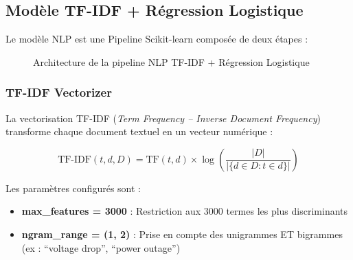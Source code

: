 \documentclass[12pt,a4paper]{report}
\begin{document}
\subsection{Mod\`{e}le TF-IDF + R\'{e}gression Logistique}

Le mod\`{e}le NLP est une Pipeline Scikit-learn compos\'{e}e de deux \'{e}tapes :

\begin{figure}[H]
\centering
{}
\caption{Architecture de la pipeline NLP TF-IDF + R\'{e}gression Logistique}
\label{fig:nlp_arch}
\end{figure}

\subsubsection{TF-IDF Vectorizer}

La vectorisation TF-IDF (\textit{Term Frequency -- Inverse Document Frequency}) transforme chaque document textuel en un vecteur num\'{e}rique :

\begin{equation}
  \text{TF-IDF}(t, d, D) = \text{TF}(t, d) \times \log\!\left(\frac{|D|}{|\{d \in D : t \in d\}|}\right)
  \label{eq:tfidf}
\end{equation}

Les param\`{e}tres configur\'{e}s sont :
\begin{itemize}
  \item \textbf{max\_features = 3000} : Restriction aux 3000 termes les plus discriminants
  \item \textbf{ngram\_range = (1, 2)} : Prise en compte des unigrammes ET bigrammes (ex : ``voltage drop'', ``power outage'')
\end{itemize}
\end{document}
